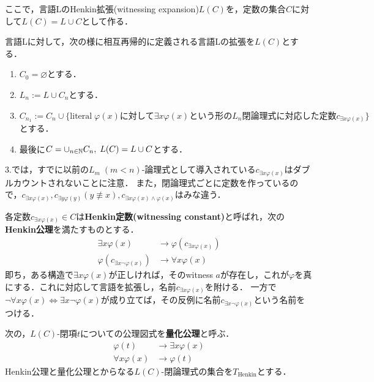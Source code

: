 \documentclass[uplatex, dvipdfmx]{jsreport}
\begin{document}
ここで，言語LのHenkin拡張(witnessing expansion)$L(C)$を，定数の集合$C$に対して$L(C)=L\cup C$として作る．
\begin{definition}
    言語Lに対して，次の様に相互再帰的に定義される言語Lの拡張を$L(C)$とする．
    \begin{enumerate}
        \item $C_0=\varnothing$とする．
        \item $L_n:=L\cup C_n$とする．
        \item $C_{n_1}:=C_n\cup\{\mathrm{literal}\;\varphi(x)に対して\exists x\varphi(x)という形のL_n閉論理式に対応した定数c_{\exists x\varphi(x)}\}$とする．
        \item 最後に$C=\cup_{n\in\mathbb{N}}C_n,\;L(C)=L\cup C$とする．
    \end{enumerate}
    3.では，すでに以前の$L_m\;(m<n)$-論理式として導入されている$c_{\exists x\varphi(x)}$はダブルカウントされないことに注意．
    また，閉論理式ごとに定数を作っているので，$c_{\exists x\varphi(x)},c_{\exists y\varphi(y)}(y\not\equiv x),c_{\exists x\varphi(x) \land \varphi(x)}$はみな違う．
\end{definition}
\begin{definition}
    各定数$c_{\exists x\varphi(x)}\in C$は\textbf{Henkin定数(witnessing constant)}と呼ばれ，次の\textbf{Henkin公理}を満たすものとする．
    \begin{align*}
        \exists x\varphi(x)&\to \varphi(c_{\exists x\varphi(x)})\\
        \varphi(c_{\exists x\lnot\varphi(x)})&\to \forall x\varphi(x)
    \end{align*}
    即ち，ある構造で$\exists x\varphi(x)$が正しければ，そのwitness $a$が存在し，これが$\varphi$を真にする．これに対応して言語を拡張し，名前$c_{\exists x\varphi(x)}$を附ける．
    一方で$\lnot\forall x\varphi(x)\Leftrightarrow\exists x\lnot\varphi(x)$が成り立てば，その反例に名前$c_{\exists x\lnot\varphi(x)}$という名前をつける．
\end{definition}
\begin{definition}\label{axiom-quantifier}
    次の，$L(C)$-閉項$t$についての公理図式を\textbf{量化公理}と呼ぶ．
    \begin{align*}
        \varphi(t)&\to\exists x\varphi(x)\\
        \forall x\varphi(x)&\to\varphi(t)
    \end{align*}
    Henkin公理と量化公理とからなる$L(C)$-閉論理式の集合を$T_\mathrm{Henkin}$とする．
\end{definition}
\end{document}
